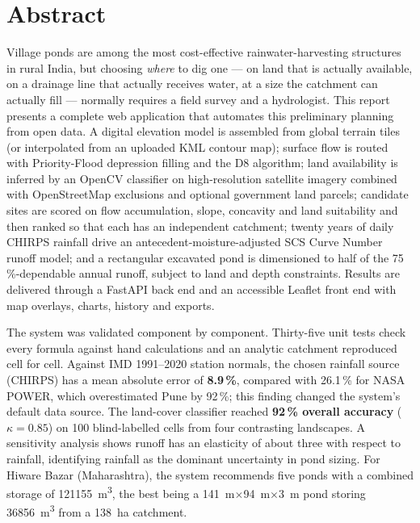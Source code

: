 \documentclass[11pt,a4paper]{article}
\begin{document}
\section*{Abstract}
Village ponds are among the most cost-effective rainwater-harvesting structures in rural India,
but choosing \emph{where} to dig one --- on land that is actually available, on a drainage line
that actually receives water, at a size the catchment can actually fill --- normally requires a
field survey and a hydrologist. This report presents a complete web application that automates
this preliminary planning from open data. A digital elevation model is assembled from global
terrain tiles (or interpolated from an uploaded KML contour map); surface flow is routed with
Priority-Flood depression filling and the D8 algorithm; land availability is inferred by an
OpenCV classifier on high-resolution satellite imagery combined with OpenStreetMap exclusions
and optional government land parcels; candidate sites are scored on flow accumulation, slope,
concavity and land suitability and then ranked so that each has an independent catchment;
twenty years of daily CHIRPS rainfall drive an antecedent-moisture-adjusted SCS Curve Number
runoff model; and a rectangular excavated pond is dimensioned to half of the 75\,\%-dependable
annual runoff, subject to land and depth constraints. Results are delivered through a FastAPI
back end and an accessible Leaflet front end with map overlays, charts, history and exports.

The system was validated component by component. Thirty-five unit tests check every formula
against hand calculations and an analytic catchment reproduced cell for cell. Against IMD
1991--2020 station normals, the chosen rainfall source (CHIRPS) has a mean absolute error of
\textbf{8.9\,\%}, compared with 26.1\,\% for NASA POWER, which overestimated Pune by 92\,\%;
this finding changed the system's default data source. The land-cover classifier reached
\textbf{92\,\% overall accuracy} ($\kappa=0.85$) on 100 blind-labelled cells from four
contrasting landscapes. A sensitivity analysis shows runoff has an elasticity of about three
with respect to rainfall, identifying rainfall as the dominant uncertainty in pond sizing. For
Hiware Bazar (Maharashtra), the system recommends five ponds with a combined storage of
\SI{121155}{\cubic\metre}, the best being a
\SI{141}{m}$\times$\SI{94}{m}$\times$\SI{3}{m} pond storing \SI{36856}{\cubic\metre} from a
\SI{138}{ha} catchment.
\end{document}
